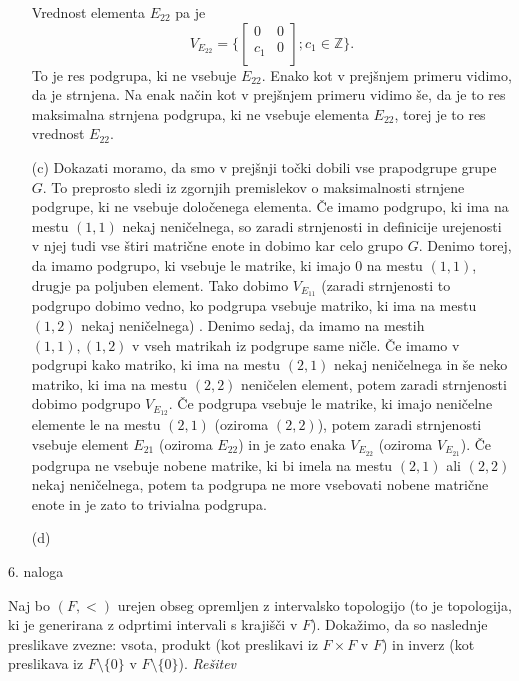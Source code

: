 \documentclass[a4paper, 12pt]{article}
\newcommand{\Z}{\mathbb{Z}}
\begin{document}
\begin{enumerate}
Vrednost elementa $E_{22}$ pa je 
$$
V_{E_{22}} = \big\{
\begin{bmatrix}
0 & 0 \\
c_1 & 0 \\
\end{bmatrix};
c_1 \in \Z
\big\}. 
$$
To je res podgrupa, ki ne vsebuje $E_{22}$. Enako kot v prejšnjem primeru vidimo, da je strnjena. Na enak način kot v prejšnjem primeru vidimo še, da je to res maksimalna strnjena podgrupa, ki ne vsebuje elementa $E_{22}$, torej je to res vrednost $E_{22}$.

\item[(c)] Dokazati moramo, da smo v prejšnji točki dobili vse prapodgrupe grupe $G$. To preprosto sledi iz zgornjih premislekov o maksimalnosti strnjene podgrupe, ki ne vsebuje določenega elementa. Če imamo podgrupo, ki ima na mestu $(1,1)$ nekaj neničelnega, so zaradi strnjenosti in definicije urejenosti v njej tudi vse štiri matrične enote in dobimo kar celo grupo $G$. Denimo torej, da imamo podgrupo, ki vsebuje le matrike, ki imajo 0 na mestu $(1,1)$, drugje pa poljuben element. Tako dobimo $V_{E_{11}}$ (zaradi strnjenosti to podgrupo dobimo vedno, ko podgrupa vsebuje matriko, ki ima na mestu $(1,2)$ nekaj neničelnega) . Denimo sedaj, da imamo na mestih $(1,1),(1,2)$ v vseh matrikah iz podgrupe same ničle. Če imamo v podgrupi kako matriko, ki ima na mestu $(2,1)$ nekaj neničelnega in še neko matriko, ki ima na mestu $(2,2)$ neničelen element, potem zaradi strnjenosti dobimo podgrupo $V_{E_{12}}$. Če podgrupa vsebuje le matrike, ki imajo neničelne elemente le na mestu $(2,1)$ (oziroma $(2,2)$), potem zaradi strnjenosti vsebuje element $E_{21}$ (oziroma $E_{22}$) in je zato enaka $V_{E_{22}}$ (oziroma $V_{E_{21}}$). Če podgrupa ne vsebuje nobene matrike, ki bi imela na mestu $(2,1)$ ali $(2,2)$ nekaj neničelnega, potem ta podgrupa ne more vsebovati nobene matrične enote in je zato to trivialna podgrupa. 
\item[(d)]
\end{enumerate}

\begin{flushleft}
6. naloga
\end{flushleft}
Naj bo $(F,<)$ urejen obseg opremljen z intervalsko topologijo (to je topologija, ki je generirana z odprtimi intervali s krajišči v $F$). Dokažimo, da so naslednje preslikave zvezne: vsota, produkt (kot preslikavi iz $F\times F$ v $F$) in inverz (kot preslikava iz $F \setminus \{0\}$ v $F\setminus \{0\}$).
\newline
\emph{Rešitev}
\end{document}
